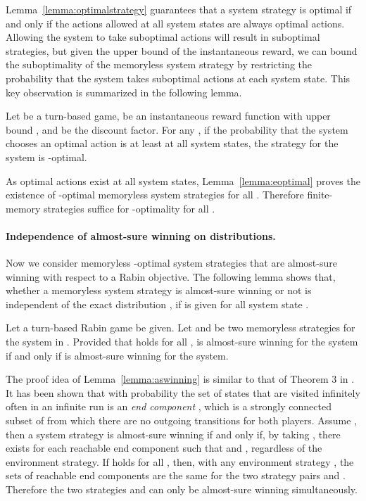 \documentclass[runningheads,a4paper]{llncs}
\begin{document}
Lemma~\ref{lemma:optimalstrategy} guarantees that a system strategy is optimal if and only if the actions allowed at all system states are always optimal actions. Allowing the system to take suboptimal actions will result in suboptimal strategies, but given the upper bound of the instantaneous reward, we can bound the suboptimality of the memoryless system strategy by restricting the probability that the system takes suboptimal actions at each system state. This key observation is summarized in the following lemma. 


\begin{lemma}
Let  be a turn-based game,  be an instantaneous reward function with upper bound , and  be the discount factor. For any , if the probability that the system chooses an optimal action is at least  at all system states, the strategy for the system is -optimal.
\label{lemma:eoptimal}
\end{lemma}

As optimal actions exist at all system states, Lemma~\ref{lemma:eoptimal} proves the existence of -optimal memoryless system strategies for all . Therefore finite-memory strategies suffice for -optimality for all . 



\paragraph{Independence of almost-sure winning on distributions.}


Now we consider memoryless -optimal system strategies that are almost-sure winning with respect to a Rabin objective. 
The following lemma shows that, whether a memoryless system strategy  is almost-sure winning or not is independent of the exact distribution , if  is given for all system state . 






\begin{lemma}
Let a turn-based Rabin game  be given. Let  and  be two memoryless strategies for the system in . 
Provided that  holds for all ,  is almost-sure winning for the system if and only if  is almost-sure winning for the system.
\label{lemma:aswinning}
\end{lemma}

The proof idea of Lemma~\ref{lemma:aswinning} is similar to that of Theorem 3 in \cite{chatterjee2005complexity}. It has been shown that with probability  the set of states that are visited infinitely often in an infinite run is an \emph{end component} \cite{de1997formal}, which is a strongly connected subset of  from which there are no outgoing transitions for both players. Assume , then a system strategy  is almost-sure winning if and only if, by taking , there exists  for each reachable end component  such that  and , regardless of the environment strategy. If  holds for all , then, with any environment strategy , the sets of reachable end components are the same for the two strategy pairs  and . Therefore the two strategies  and  can only be almost-sure winning simultaneously. 
\end{document}
